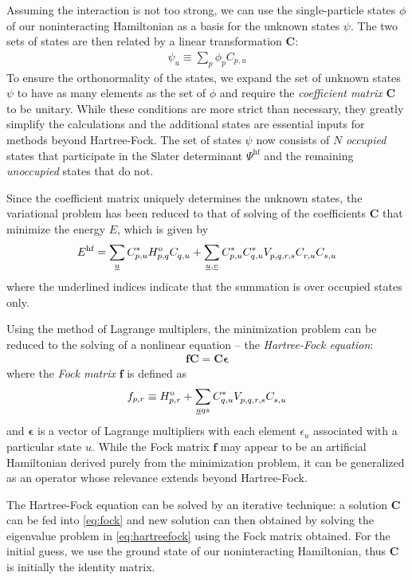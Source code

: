 \documentclass[amsmath, amssymb, aps, floatfix, nofootinbib, preprintnumbers,showpacs, superscriptaddress, twocolumn]{revtex4-1}
\begin{document}
Assuming the interaction is not too strong, we can use the single-particle
states $\phi$ of our noninteracting Hamiltonian as a basis for the unknown
states $\psi$.  The two sets of states are then related by a linear
transformation $\bm C$:
\begin{align*}
  \psi_u \equiv \sum_p \phi_p C_{p, u}
\end{align*}
To ensure the orthonormality of the states, we expand the set of unknown
states $\psi$ to have as many elements as the set of $\phi$ and require the
\textit{coefficient matrix} $\bm C$ to be unitary.  While these conditions
are more strict than necessary, they greatly simplify the calculations and the
additional states are essential inputs for methods beyond Hartree-Fock.  The
set of states $\psi$ now consists of $N$ \textit{occupied} states that
participate in the Slater determinant $\Psi^{\text{hf}}$ and the remaining
\textit{unoccupied} states that do not.

Since the coefficient matrix uniquely determines the unknown states, the
variational problem has been reduced to that of solving of the coefficients
$\bm C$ that minimize the energy $E$, which is given by
\begin{align*}
  E^{\text{hf}} = \sum_{\underline u} C_{p, u}^* H_{p, q}^{\text o} C_{q, u}^{}
  + \sum_{\underline u, \underline v}
  C_{p, u}^* C_{q, u}^* V_{p, q, r, s}^{} C_{r, u}^{} C_{s, u}^{}
\end{align*}
where the underlined indices indicate that the summation is over occupied
states only.

Using the method of Lagrange multiplers, the minimization problem can be
reduced to the solving of a nonlinear equation -- the \textit{Hartree-Fock
  equation}:
\begin{align} \label{eq:hartreefock}
  \bm f \bm C = \bm C \bm \epsilon
\end{align}
where the \textit{Fock matrix} $\bm f$ is defined as
\begin{align} \label{eq:fock}
  f_{p, r} \equiv H_{p, r}^{\text o} + \sum_{\underline u q s}
  C_{q, u}^* V_{p, q, r, s}^{} C_{s, u}^{}
\end{align}
and $\bm \epsilon$ is a vector of Lagrange multipliers with each
element $\epsilon_u$ associated with a particular state $u$.  While the Fock
matrix $\bm f$ may appear to be an artificial Hamiltonian derived purely
from the minimization problem, it can be generalized as an operator whose
relevance extends beyond Hartree-Fock.

The Hartree-Fock equation can be solved by an iterative technique: a solution
$\bm C$ can be fed into \eqref{eq:fock} and new solution can then obtained
by solving the eigenvalue problem in \eqref{eq:hartreefock} using the Fock
matrix obtained.  For the initial guess, we use the ground state of our
noninteracting Hamiltonian, thus $\bm C$ is initially the identity matrix.
\end{document}
